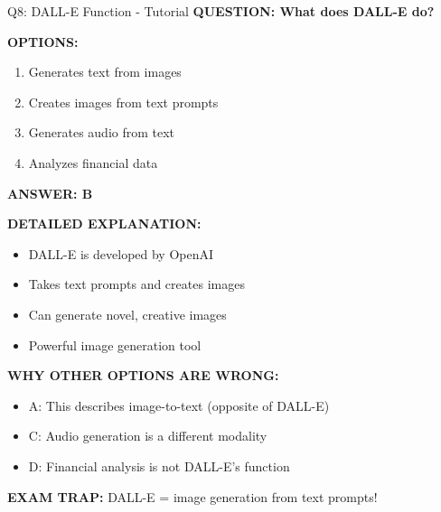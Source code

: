\documentclass[8pt]{beamer}
\begin{document}
	\begin{frame}{Q8: DALL-E Function - Tutorial}
		\fontsize{6.5}{7.5}\selectfont
		\textbf{QUESTION: What does DALL-E do?}
		
		\vspace{0.1cm}
		\textbf{OPTIONS:}
		\begin{enumerate}
			\item Generates text from images
			\item Creates images from text prompts
			\item Generates audio from text
			\item Analyzes financial data
		\end{enumerate}
		
		\vspace{0.1cm}
		\textcolor{myblue}{\textbf{ANSWER: B}}
		
		\vspace{0.1cm}
		\textbf{DETAILED EXPLANATION:}
		\begin{itemize}
			\item DALL-E is developed by OpenAI
			\item Takes text prompts and creates images
			\item Can generate novel, creative images
			\item Powerful image generation tool
		\end{itemize}
		
		\vspace{0.1cm}
		\textcolor{myred}{\textbf{WHY OTHER OPTIONS ARE WRONG:}}
		\begin{itemize}
			\item \textcolor{myred}{A:} This describes image-to-text (opposite of DALL-E)
			\item \textcolor{myred}{C:} Audio generation is a different modality
			\item \textcolor{myred}{D:} Financial analysis is not DALL-E's function
		\end{itemize}
		
		\textcolor{myred}{\textbf{EXAM TRAP:}} DALL-E = \textcolor{myblue}{image generation from text prompts}!
	\end{frame}
	
\end{document}
